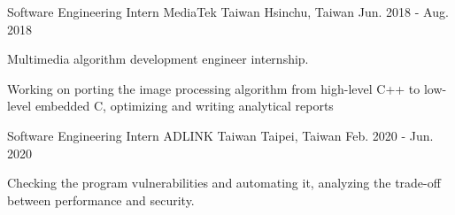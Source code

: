 

\begin{cventries}

\cventry
    {Software Engineering Intern} %
    {MediaTek Taiwan} %
    {Hsinchu, Taiwan} %
    {Jun. 2018 - Aug. 2018} %
    {
      \begin{cvitems} %
        \item {Multimedia algorithm development engineer internship.}
        \item {Working on porting the image processing algorithm from high-level C++ to low-level embedded C, optimizing and writing analytical reports}
      \end{cvitems}
    }

\cventry
    {Software Engineering Intern} %
    {ADLINK Taiwan} %
    {Taipei, Taiwan} %
    {Feb. 2020 - Jun. 2020} %
    {
      \begin{cvitems} %
        \item {Checking the program vulnerabilities and automating it, analyzing the trade-off between performance and security.}
      \end{cvitems}
    } 
\end{cventries}
